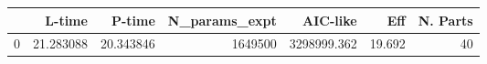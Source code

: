 \begin{tabular}{lrrrrrr}
\toprule
{} &     L-time &     P-time &  N\_params\_expt &     AIC-like &     Eff &  N. Parts \\
\midrule
0 &  21.283088 &  20.343846 &        1649500 &  3298999.362 &  19.692 &        40 \\
\bottomrule
\end{tabular}
